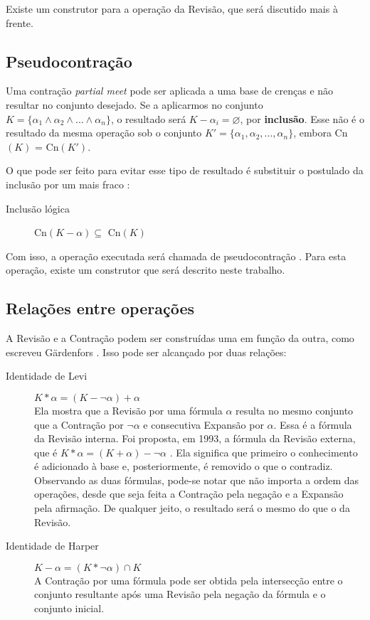 Existe um construtor para a operação da Revisão, que será discutido mais à frente.

\subsection{Pseudocontração}

Uma contração \textit{partial meet} pode ser aplicada a uma base de crenças e não resultar no conjunto desejado. Se a aplicarmos no conjunto $ K = \{\alpha_1 \land \alpha_2 \land ... \land \alpha_n\} $, o resultado será $ K - \alpha_i = \varnothing $, por \textbf{inclusão}. Esse não é o resultado da mesma operação sob o conjunto $ K' = \{\alpha_1, \alpha_2, ..., \alpha_n\} $, embora Cn$(K)$ = Cn$(K')$.

O que pode ser feito para evitar esse tipo de resultado é substituir o postulado da inclusão por um mais fraco \citep{revisaoHansson3}:

\begin{description}
	\item[Inclusão lógica] Cn$(K - \alpha) \subseteq $ Cn$(K)$ 
\end{description}

Com isso, a operação executada será chamada de pseudocontração \citep{revisaoHansson4}. Para esta operação, existe um construtor que será descrito neste trabalho.

\subsection{Relações entre operações}

A Revisão e a Contração podem ser construídas uma em função da outra, como escreveu Gärdenfors \citep{revisaoGardenfors}. Isso pode ser alcançado por duas relações:

\begin{description}
	\item[Identidade de Levi] $ K \ast \alpha = (K - \lnot \alpha) + \alpha $ \\ Ela mostra que a Revisão por uma fórmula $ \alpha $ resulta no mesmo conjunto que a Con\-tra\-ção por $ \lnot \alpha $ e consecutiva Expansão por $ \alpha $. Essa é a fórmula da Revisão interna. Foi proposta, em 1993, a fórmula da Revisão externa, que é $ K \ast \alpha = (K + \alpha) - \lnot \alpha $ \citep{revisaoHansson2}. Ela significa que primeiro o conhecimento é adicionado à base e, posteriormente, é removido o que o contradiz. Observando as duas fórmulas, pode-se notar que não importa a ordem das operações, desde que seja feita a Contração pela negação e a Expansão pela afirmação. De qualquer jeito, o resultado será o mesmo do que o da Revisão.
	\item[Identidade de Harper] $ K - \alpha = (K \ast \lnot \alpha) \cap K $ \\ A Contração por uma fórmula pode ser obtida pela intersecção entre o conjunto resultante após uma Revisão pela negação da fórmula e o conjunto inicial.
\end{description}

